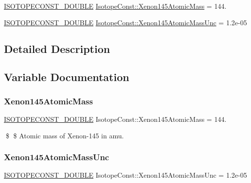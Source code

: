 \begin{DoxyCompactItemize}
\item 
\mbox{\hyperlink{group___isotope_const-_macros_ga8f45a7272ce02c0b4c65c44636ed719a}{I\+S\+O\+T\+O\+P\+E\+C\+O\+N\+S\+T\+\_\+\+D\+O\+U\+B\+LE}} \mbox{\hyperlink{group___isotope_const-_xenon-_xe145_ga876b0a620f8bf0185e7c4e27ef1bf1f1}{Isotope\+Const\+::\+Xenon145\+Atomic\+Mass}} = 144.
\item 
\mbox{\hyperlink{group___isotope_const-_macros_ga8f45a7272ce02c0b4c65c44636ed719a}{I\+S\+O\+T\+O\+P\+E\+C\+O\+N\+S\+T\+\_\+\+D\+O\+U\+B\+LE}} \mbox{\hyperlink{group___isotope_const-_xenon-_xe145_gad32c8eb409f0ac224bca769528611288}{Isotope\+Const\+::\+Xenon145\+Atomic\+Mass\+Unc}} = 1.\+2e-\/05
\end{DoxyCompactItemize}


\subsection{Detailed Description}


\subsection{Variable Documentation}
\mbox{\label{group___isotope_const-_xenon-_xe145_ga876b0a620f8bf0185e7c4e27ef1bf1f1}} 
\subsubsection{\texorpdfstring{Xenon145\+Atomic\+Mass}{Xenon145AtomicMass}}
{\footnotesize\ttfamily \mbox{\hyperlink{group___isotope_const-_macros_ga8f45a7272ce02c0b4c65c44636ed719a}{I\+S\+O\+T\+O\+P\+E\+C\+O\+N\+S\+T\+\_\+\+D\+O\+U\+B\+LE}} Isotope\+Const\+::\+Xenon145\+Atomic\+Mass = 144.}

\$ \$ Atomic mass of Xenon-\/145 in amu. \mbox{\label{group___isotope_const-_xenon-_xe145_gad32c8eb409f0ac224bca769528611288}} 
\subsubsection{\texorpdfstring{Xenon145\+Atomic\+Mass\+Unc}{Xenon145AtomicMassUnc}}
{\footnotesize\ttfamily \mbox{\hyperlink{group___isotope_const-_macros_ga8f45a7272ce02c0b4c65c44636ed719a}{I\+S\+O\+T\+O\+P\+E\+C\+O\+N\+S\+T\+\_\+\+D\+O\+U\+B\+LE}} Isotope\+Const\+::\+Xenon145\+Atomic\+Mass\+Unc = 1.\+2e-\/05}

